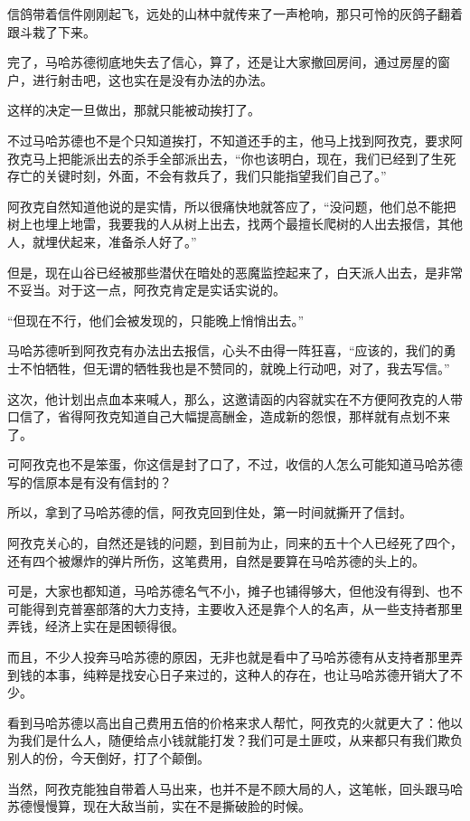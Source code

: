 信鸽带着信件刚刚起飞，远处的山林中就传来了一声枪响，那只可怜的灰鸽子翻着跟斗栽了下来。

完了，马哈苏德彻底地失去了信心，算了，还是让大家撤回房间，通过房屋的窗户，进行射击吧，这也实在是没有办法的办法。

这样的决定一旦做出，那就只能被动挨打了。

不过马哈苏德也不是个只知道挨打，不知道还手的主，他马上找到阿孜克，要求阿孜克马上把能派出去的杀手全部派出去，“你也该明白，现在，我们已经到了生死存亡的关键时刻，外面，不会有救兵了，我们只能指望我们自己了。”

阿孜克自然知道他说的是实情，所以很痛快地就答应了，“没问题，他们总不能把树上也埋上地雷，我要我的人从树上出去，找两个最擅长爬树的人出去报信，其他人，就埋伏起来，准备杀人好了。”

但是，现在山谷已经被那些潜伏在暗处的恶魔监控起来了，白天派人出去，是非常不妥当。对于这一点，阿孜克肯定是实话实说的。

“但现在不行，他们会被发现的，只能晚上悄悄出去。”

马哈苏德听到阿孜克有办法出去报信，心头不由得一阵狂喜，“应该的，我们的勇士不怕牺牲，但无谓的牺牲我也是不赞同的，就晚上行动吧，对了，我去写信。”

这次，他计划出点血本来喊人，那么，这邀请函的内容就实在不方便阿孜克的人带口信了，省得阿孜克知道自己大幅提高酬金，造成新的怨恨，那样就有点划不来了。

可阿孜克也不是笨蛋，你这信是封了口了，不过，收信的人怎么可能知道马哈苏德写的信原本是有没有信封的？

所以，拿到了马哈苏德的信，阿孜克回到住处，第一时间就撕开了信封。

阿孜克关心的，自然还是钱的问题，到目前为止，同来的五十个人已经死了四个，还有四个被爆炸的弹片所伤，这笔费用，自然是要算在马哈苏德的头上的。

可是，大家也都知道，马哈苏德名气不小，摊子也铺得够大，但他没有得到、也不可能得到克普塞部落的大力支持，主要收入还是靠个人的名声，从一些支持者那里弄钱，经济上实在是困顿得很。

而且，不少人投奔马哈苏德的原因，无非也就是看中了马哈苏德有从支持者那里弄到钱的本事，纯粹是找安心日子来过的，这种人的存在，也让马哈苏德开销大了不少。

看到马哈苏德以高出自己费用五倍的价格来求人帮忙，阿孜克的火就更大了：他以为我们是什么人，随便给点小钱就能打发？我们可是土匪哎，从来都只有我们欺负别人的份，今天倒好，打了个颠倒。

当然，阿孜克能独自带着人马出来，也并不是不顾大局的人，这笔帐，回头跟马哈苏德慢慢算，现在大敌当前，实在不是撕破脸的时候。

